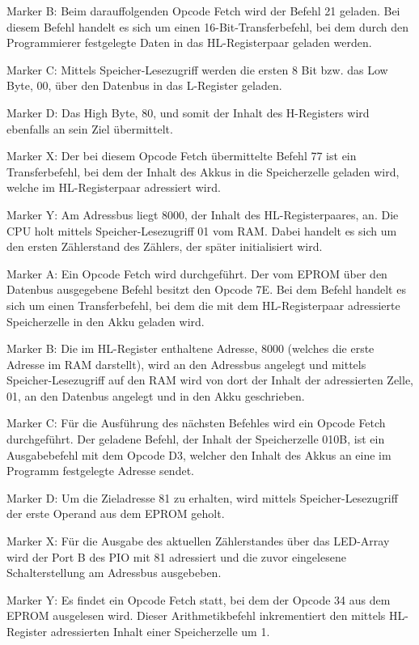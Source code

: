 Marker B: Beim darauffolgenden Opcode Fetch wird der Befehl 21 geladen. Bei diesem Befehl handelt es sich um einen 16-Bit-Transferbefehl, bei dem durch den Programmierer festgelegte Daten in das HL-Registerpaar geladen werden.

Marker C: Mittels Speicher-Lesezugriff werden die ersten 8 Bit bzw. das Low Byte, 00, über den Datenbus in das L-Register geladen.

Marker D: Das High Byte, 80, und somit der Inhalt des H-Registers wird ebenfalls an sein Ziel übermittelt.

Marker X: Der bei diesem Opcode Fetch übermittelte Befehl 77 ist ein Transferbefehl, bei dem der Inhalt des Akkus in die Speicherzelle geladen wird, welche im HL-Registerpaar adressiert wird.

Marker Y: Am Adressbus liegt 8000, der Inhalt des HL-Registerpaares, an. Die CPU holt mittels Speicher-Lesezugriff 01 vom RAM. Dabei handelt es sich um den ersten Zählerstand des Zählers, der später initialisiert wird.

Marker A: Ein Opcode Fetch wird durchgeführt. Der vom EPROM über den Datenbus ausgegebene Befehl besitzt den Opcode 7E. Bei dem Befehl handelt es sich um einen Transferbefehl, bei dem die mit dem HL-Registerpaar adressierte Speicherzelle in den Akku geladen wird.

Marker B: Die im HL-Register enthaltene Adresse, 8000 (welches die erste Adresse im RAM darstellt), wird an den Adressbus angelegt und mittels Speicher-Lesezugriff auf den RAM wird von dort der Inhalt der adressierten Zelle, 01, an den Datenbus angelegt und in den Akku geschrieben.

Marker C: Für die Ausführung des nächsten Befehles wird ein Opcode Fetch durchgeführt. Der geladene Befehl, der Inhalt der Speicherzelle 010B, ist ein Ausgabebefehl mit dem Opcode D3, welcher den Inhalt des Akkus an eine im Programm festgelegte Adresse sendet.

Marker D: Um die Zieladresse 81 zu erhalten, wird mittels Speicher-Lesezugriff der erste Operand aus dem EPROM geholt.

Marker X: Für die Ausgabe des aktuellen Zählerstandes über das LED-Array wird der Port B des PIO mit 81 adressiert und die zuvor eingelesene Schalterstellung am Adressbus ausgebeben.

Marker Y: Es findet ein Opcode Fetch statt, bei dem der Opcode 34 aus dem EPROM ausgelesen wird. Dieser Arithmetikbefehl inkrementiert den mittels HL-Register adressierten Inhalt einer Speicherzelle um 1.

